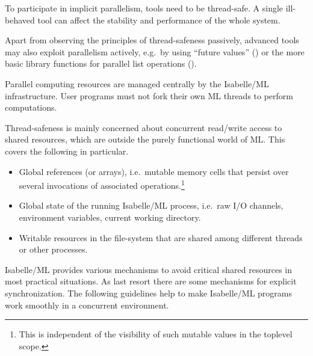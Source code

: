 \begin{isabellebody}
\begin{isamarkuptext}
  \begin{warn}
  To participate in implicit parallelism, tools need to be
  thread-safe.  A single ill-behaved tool can affect the stability and
  performance of the whole system.
  \end{warn}

  Apart from observing the principles of thread-safeness passively,
  advanced tools may also exploit parallelism actively, e.g.\ by using
  ``future values'' () or the more basic library
  functions for parallel list operations ().

  \begin{warn}
  Parallel computing resources are managed centrally by the
  Isabelle/ML infrastructure.  User programs must not fork their own
  ML threads to perform computations.
  \end{warn}%
\end{isamarkuptext}%
\isamarkuptrue%
%
\isamarkuptrue%
%
\begin{isamarkuptext}%
Thread-safeness is mainly concerned about concurrent
  read/write access to shared resources, which are outside the purely
  functional world of ML.  This covers the following in particular.

  \begin{itemize}

  \item Global references (or arrays), i.e.\ mutable memory cells that
  persist over several invocations of associated
  operations.\footnote{This is independent of the visibility of such
  mutable values in the toplevel scope.}

  \item Global state of the running Isabelle/ML process, i.e.\ raw I/O
  channels, environment variables, current working directory.

  \item Writable resources in the file-system that are shared among
  different threads or other processes.

  \end{itemize}

  Isabelle/ML provides various mechanisms to avoid critical shared
  resources in most practical situations.  As last resort there are
  some mechanisms for explicit synchronization.  The following
  guidelines help to make Isabelle/ML programs work smoothly in a
  concurrent environment.

  \begin{itemize}


\end{itemize}
\end{isamarkuptext}
\end{isabellebody}
